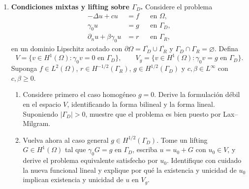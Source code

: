 \documentclass[11pt]{article}
\theoremstyle{thmstyle}
\begin{document}
\begin{enumerate}[label=\textbf{\arabic*.}, leftmargin=*]

    \item \textbf{Condiciones mixtas y lifting sobre $\Gamma_D$.} Considere el problema
    \[
    \begin{aligned}
        -\Delta u + cu &= f &&\text{en }\Omega,\\
        \gamma_0u &=g &&\text{en }\Gamma_D,\\
        \partial_n u+\beta\gamma_0u &= r &&\text{en }\Gamma_R,
    \end{aligned}
    \]
    en un dominio Lipschitz acotado con $\partial\Omega=\overline{\Gamma_D}\cup\overline{\Gamma_R}$ y $\Gamma_D\cap\Gamma_R=\varnothing$. Defina
    \[
        V=\{v\in H^1(\Omega):\gamma_0v=0\text{ en }\Gamma_D\},
        \qquad
        V_g=\{v\in H^1(\Omega):\gamma_0v=g\text{ en }\Gamma_D\}.
    \]
    Suponga $f\in L^2(\Omega)$, $r\in H^{-1/2}(\Gamma_R)$, $g\in H^{1/2}(\Gamma_D)$ y $c,\beta\in L^\infty$ con $c,\beta\ge 0$.
    \begin{enumerate}[label=(\alph*)]
        \item Considere primero el caso homog\'eneo $g=0$. Derive la formulaci\'on d\'ebil en el espacio $V$, identificando la forma bilineal y la forma lineal. Suponiendo $|\Gamma_D|>0$, muestre que el problema es bien puesto por Lax--Milgram.
        \item Vuelva ahora al caso general $g\in H^{1/2}(\Gamma_D)$. Tome un lifting $G\in H^1(\Omega)$ tal que $\gamma_0G=g$ en $\Gamma_D$, escriba $u=u_0+G$ con $u_0\in V$, y derive el problema equivalente satisfecho por $u_0$. Identifique con cuidado la nueva funcional lineal y explique por qu\'e la existencia y unicidad de $u_0$ implican existencia y unicidad de $u$ en $V_g$.
    \end{enumerate}


\end{enumerate}
\end{document}

